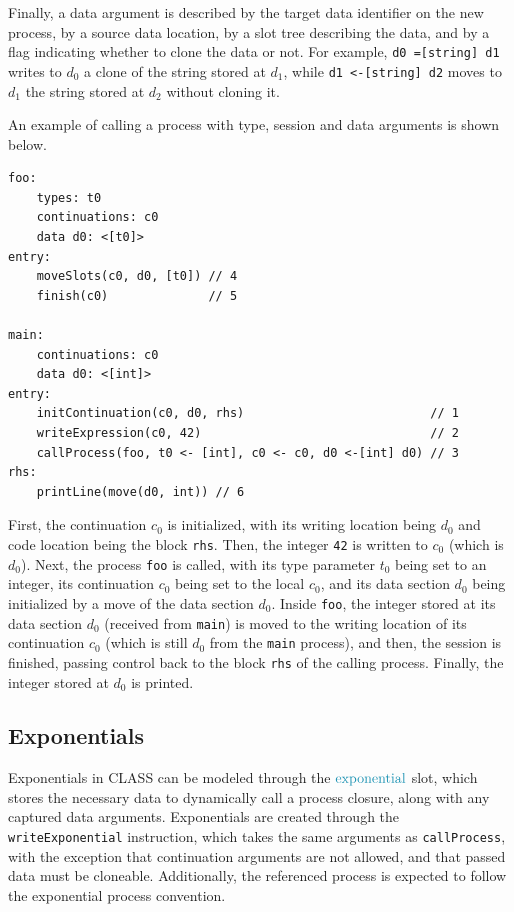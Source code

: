 Finally, a data argument is described by the target data identifier on the new process, by a source data location, by a slot tree describing the data, and by a flag indicating whether to clone the data or not. For example, \texttt{d0 =[string] d1} writes to $d_0$ a clone of the string stored at $d_1$, while \texttt{d1 <-[string] d2} moves to $d_1$ the string stored at $d_2$ without cloning it.

An example of calling a process with type, session and data arguments is shown below.
\begin{lstlisting}[language=IR, frame=bottom]
foo:
    types: t0
    continuations: c0
    data d0: <[t0]>
entry:
    moveSlots(c0, d0, [t0]) // 4
    finish(c0)              // 5

main:
    continuations: c0
    data d0: <[int]>
entry:
    initContinuation(c0, d0, rhs)                          // 1
    writeExpression(c0, 42)                                // 2
    callProcess(foo, t0 <- [int], c0 <- c0, d0 <-[int] d0) // 3
rhs:
    printLine(move(d0, int)) // 6
\end{lstlisting}
First, the continuation $c_0$ is initialized, with its writing location being $d_0$ and code location being the block \texttt{rhs}. Then, the integer \texttt{42} is written to $c_0$ (which is $d_0$). Next, the process \texttt{foo} is called, with its type parameter $t_0$ being set to an integer, its continuation $c_0$ being set to the local $c_0$, and its data section $d_0$ being initialized by a move of the data section $d_0$. Inside \texttt{foo}, the integer stored at its data section $d_0$ (received from \texttt{main}) is moved to the writing location of its continuation $c_0$ (which is still $d_0$ from the \texttt{main} process), and then, the session is finished, passing control back to the block \texttt{rhs} of the calling process. Finally, the integer stored at $d_0$ is printed.

\subsection{Exponentials}

Exponentials in \ac{CLASS} can be modeled through the $\exponentials$ slot, which stores the necessary data to dynamically call a process closure, along with any captured data arguments. Exponentials are created through the \texttt{writeExponential} instruction, which takes the same arguments as \texttt{callProcess}, with the exception that continuation arguments are not allowed, and that passed data must be cloneable. Additionally, the referenced process is expected to follow the exponential process convention.

